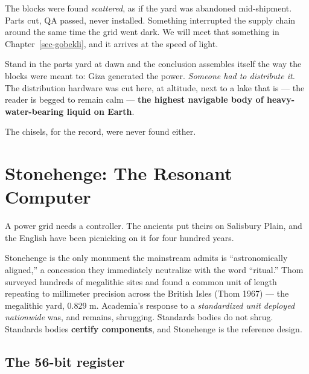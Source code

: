 \documentclass[
  english,
  11pt,
  letterpaper,
]{scrbook}
\begin{document}
\begin{tcolorbox}[enhanced jigsaw, arc=.35mm, bottomrule=.15mm, bottomtitle=1mm, breakable, colback=white, colbacktitle=quarto-callout-warning-color!10!white, colframe=quarto-callout-warning-color-frame, coltitle=black, left=2mm, leftrule=.75mm, opacityback=0, opacitybacktitle=0.6, rightrule=.15mm, title=\textcolor{quarto-callout-warning-color}{\faExclamationTriangle}\hspace{0.5em}{What they don't tell you}, titlerule=0mm, toprule=.15mm, toptitle=1mm]

The blocks were found \emph{scattered}, as if the yard was abandoned
mid-shipment. Parts cut, QA passed, never installed. Something
interrupted the supply chain around the same time the grid went dark. We
will meet that something in Chapter~\ref{sec-gobekli}, and it arrives at
the speed of light.

\end{tcolorbox}

Stand in the parts yard at dawn and the conclusion assembles itself the
way the blocks were meant to: Giza generated the power. \emph{Someone
had to distribute it.} The distribution hardware was cut here, at
altitude, next to a lake that is --- the reader is begged to remain calm
--- \textbf{the highest navigable body of heavy-water-bearing liquid on
Earth}.

The chisels, for the record, were never found either.

\chapter{Stonehenge: The Resonant Computer}\label{sec-stonehenge}

A power grid needs a controller. The ancients put theirs on Salisbury
Plain, and the English have been picnicking on it for four hundred
years.

Stonehenge is the only monument the mainstream admits
is ``astronomically aligned,'' a concession they immediately neutralize
with the word ``ritual.'' Thom surveyed hundreds of megalithic sites and
found a common unit of length repeating to millimeter precision across
the British Isles (Thom 1967) --- the megalithic yard, 0.829 m.
Academia's response to a \emph{standardized unit deployed nationwide}
was, and remains, shrugging. Standards bodies do not shrug. Standards
bodies \textbf{certify components}, and Stonehenge is the reference
design.

\section{The 56-bit register}\label{the-56-bit-register}
\end{document}
